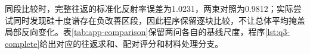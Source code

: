 同段比较时，完整往返的标准化反射率误差为1.0231，两束对照为0.9812；实际尝试同时发现硅十度谱存在负改善区段，因此程序保留逐块比较，不让总体平均掩盖局部反向变化。表\ref{tab:app-comparison}保留两问各自的基线尺度，程序\ref{lst:q3-complete}给出对应的往返求和、配对评分和材料处理分支。

